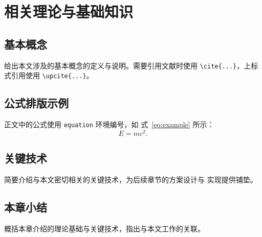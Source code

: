 %

\chapter{相关理论与基础知识}
\label{chap:background}

\section{基本概念}
给出本文涉及的基本概念的定义与说明。需要引用文献时使用
\verb|\cite{...}|，上标式引用使用 \verb|\upcite{...}|。

\section{公式排版示例}
正文中的公式使用 \texttt{equation} 环境编号，如
式~\eqref{eq:example} 所示：
\begin{equation}
\label{eq:example}
E = m c^{2}.
\end{equation}

\section{关键技术}
简要介绍与本文密切相关的关键技术，为后续章节的方案设计与
实现提供铺垫。

\section{本章小结}
概括本章介绍的理论基础与关键技术，指出与本文工作的关联。
